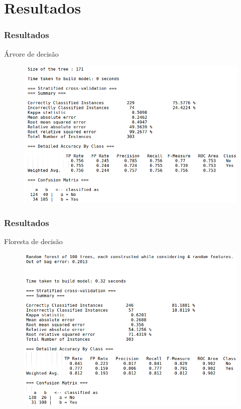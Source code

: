\documentclass{beamer}
\theoremstyle{theorem}
\theoremstyle{definition}
\begin{document}
\section{Resultados}

\begin{frame}
\frametitle{Resultados}
\begin{block}{Árvore de decisão}
\end{block}
\begin{figure}[htbp]
	\includegraphics[scale=.35]{fig/result_tree.png}
\label{fig1}
\end{figure}
\end{frame}


\begin{frame}
\frametitle{Resultados}
\begin{block}{Floresta de decisão}
\end{block}
\begin{figure}[htbp]
	\includegraphics[scale=.35]{fig/result_forest.png}
\label{fig1}
\end{figure}
\end{frame}
\end{document}
